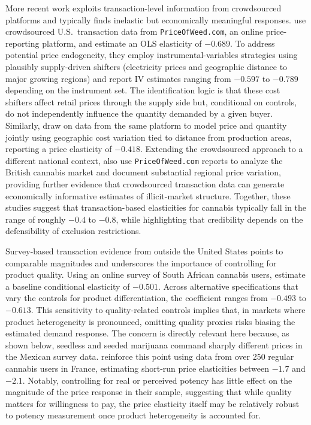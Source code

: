 More recent work exploits transaction-level information from crowdsourced platforms and typically finds inelastic but economically meaningful responses.  \citet{davis2016crowd} use crowdsourced U.S.\ transaction data from \texttt{PriceOfWeed.com}, an online price-reporting platform, and estimate an OLS elasticity of $-0.689$.  To address potential price endogeneity, they employ instrumental-variables strategies using plausibly supply-driven shifters (electricity prices and geographic distance to major growing regions) and report IV estimates ranging from $-0.597$ to $-0.789$ depending on the instrument set. The identification logic is that these cost shifters affect retail prices through the supply side but, conditional on controls, do not independently influence the quantity demanded by a given buyer. Similarly, \citet{halcoussis2017geo} draw on data from the same platform to model price and quantity jointly using geographic cost variation tied to distance from production areas, reporting a price elasticity of $-0.418$. Extending the crowdsourced approach to a different national context, \citet{giommoni2018uk} also use \texttt{PriceOfWeed.com} reports to analyze the British cannabis market and document substantial regional price variation, providing further evidence that crowdsourced transaction data can generate economically informative estimates of illicit-market structure. Together, these studies suggest that transaction-based elasticities for cannabis typically fall in the range of roughly $-0.4$ to $-0.8$, while highlighting that credibility depends on the defensibility of exclusion restrictions.

Survey-based transaction evidence from outside the United States points to comparable magnitudes and underscores the importance of controlling for product quality.  Using an online survey of South African cannabis users, \citet{riley2020southafrica} estimate a baseline conditional elasticity of $-0.501$.  Across alternative specifications that vary the controls for product differentiation, the coefficient ranges from $-0.493$ to $-0.613$.  This sensitivity to quality-related controls implies that, in markets where product heterogeneity is pronounced, omitting quality proxies risks biasing the estimated demand response.  The concern is directly relevant here because, as shown below, seedless and seeded marijuana command sharply different prices in the Mexican survey data.  \citet{benlakhdar2016potency} reinforce this point using data from over 250 regular cannabis users in France, estimating short-run price elasticities between $-1.7$ and $-2.1$.  Notably, controlling for real or perceived potency has little effect on the magnitude of the price response in their sample, suggesting that while quality matters for willingness to pay, the price elasticity itself may be relatively robust to potency measurement once product heterogeneity is accounted for.

